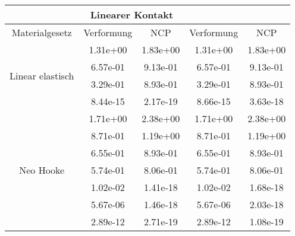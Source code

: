 \begin{table} 
\centering 
\begin{tabular}{c|cc|cc|} 
\cline{2-5} 
 & \multicolumn{2}{|c|}{Linearer Kontakt} &  \\ 
\hline 
\multicolumn{1}{|c|}{Materialgesetz} & \multicolumn{1}{c|}{Verformung} & \multicolumn{1}{c|}{NCP} & \multicolumn{1}{c|}{Verformung} & \multicolumn{1}{c|}{NCP} \\ 
\hline 
\multicolumn{1}{|c|}{\multirow{4}{*}{Linear elastisch}} &\multicolumn{1}{|c|}{  1.31e+00} & \multicolumn{1}{|c|}{  1.83e+00} & \multicolumn{1}{|c|}{  1.31e+00} & \multicolumn{1}{|c|}{  1.83e+00} \\ 
\multicolumn{1}{|c|}{} & \multicolumn{1}{|c|}{  6.57e-01} & \multicolumn{1}{|c|}{  9.13e-01} & \multicolumn{1}{|c|}{  6.57e-01} & \multicolumn{1}{|c|}{  9.13e-01} \\ 
\multicolumn{1}{|c|}{} & \multicolumn{1}{|c|}{  3.29e-01} & \multicolumn{1}{|c|}{  8.93e-01} & \multicolumn{1}{|c|}{  3.29e-01} & \multicolumn{1}{|c|}{  8.93e-01} \\ 
\multicolumn{1}{|c|}{} & \multicolumn{1}{|c|}{  8.44e-15} & \multicolumn{1}{|c|}{  2.17e-19} & \multicolumn{1}{|c|}{  8.66e-15} & \multicolumn{1}{|c|}{  3.63e-18} \\ 
\hline 
\multicolumn{1}{|c|}{\multirow{7}{*}{Neo Hooke}} &\multicolumn{1}{|c|}{  1.71e+00} & \multicolumn{1}{|c|}{  2.38e+00} & \multicolumn{1}{|c|}{  1.71e+00} & \multicolumn{1}{|c|}{  2.38e+00} \\ 
\multicolumn{1}{|c|}{} & \multicolumn{1}{|c|}{  8.71e-01} & \multicolumn{1}{|c|}{  1.19e+00} & \multicolumn{1}{|c|}{  8.71e-01} & \multicolumn{1}{|c|}{  1.19e+00} \\ 
\multicolumn{1}{|c|}{} & \multicolumn{1}{|c|}{  6.55e-01} & \multicolumn{1}{|c|}{  8.93e-01} & \multicolumn{1}{|c|}{  6.55e-01} & \multicolumn{1}{|c|}{  8.93e-01} \\ 
\multicolumn{1}{|c|}{} & \multicolumn{1}{|c|}{  5.74e-01} & \multicolumn{1}{|c|}{  8.06e-01} & \multicolumn{1}{|c|}{  5.74e-01} & \multicolumn{1}{|c|}{  8.06e-01} \\ 
\multicolumn{1}{|c|}{} & \multicolumn{1}{|c|}{  1.02e-02} & \multicolumn{1}{|c|}{  1.41e-18} & \multicolumn{1}{|c|}{  1.02e-02} & \multicolumn{1}{|c|}{  1.68e-18} \\ 
\multicolumn{1}{|c|}{} & \multicolumn{1}{|c|}{  5.67e-06} & \multicolumn{1}{|c|}{  1.46e-18} & \multicolumn{1}{|c|}{  5.67e-06} & \multicolumn{1}{|c|}{  2.03e-18} \\ 
\multicolumn{1}{|c|}{} & \multicolumn{1}{|c|}{  2.89e-12} & \multicolumn{1}{|c|}{  2.71e-19} & \multicolumn{1}{|c|}{  2.89e-12} & \multicolumn{1}{|c|}{  1.08e-19} \\ 

\end{tabular}
\end{table}
